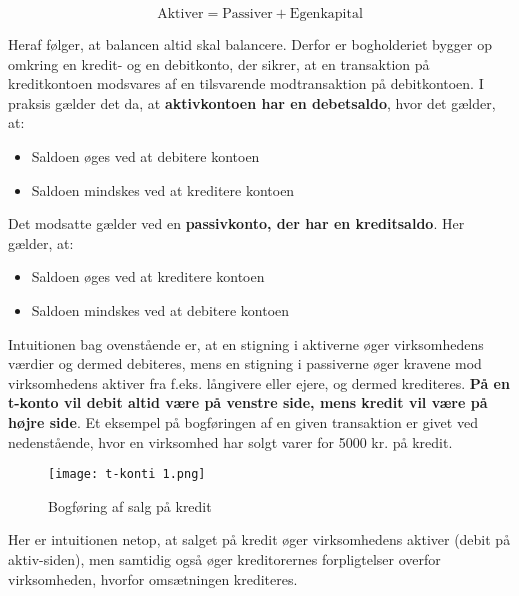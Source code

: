 \documentclass[10pt,reqno, usenames]{article}
\begin{document}
\begin{equation}
     \text {Aktiver} = \text {Passiver} + \text {Egenkapital} 
\end{equation}

Heraf følger, at balancen altid skal balancere. Derfor er bogholderiet bygger op omkring en kredit- og en debitkonto, der sikrer, at en transaktion på kreditkontoen modsvares af en tilsvarende modtransaktion på debitkontoen. I praksis gælder det da, at \textbf{aktivkontoen har en debetsaldo}, hvor det gælder, at:
\begin{itemize}
    \item Saldoen øges ved at debitere kontoen 
    \item Saldoen mindskes ved at kreditere kontoen
\end{itemize}
Det modsatte gælder ved en \textbf{passivkonto, der har en kreditsaldo}. Her gælder, at:  
\begin{itemize}
    \item Saldoen øges ved at kreditere kontoen 
    \item Saldoen mindskes ved at debitere kontoen
\end{itemize}
Intuitionen bag ovenstående er, at en stigning i aktiverne øger virksomhedens værdier og dermed debiteres, mens en stigning i passiverne øger kravene mod virksomhedens aktiver fra f.eks. långivere eller ejere, og dermed krediteres. \textbf{På en t-konto vil debit altid være på venstre side, mens kredit vil være på højre side}. Et eksempel på bogføringen af en given transaktion er givet ved nedenstående, hvor en virksomhed har solgt varer for 5000 kr. på kredit. 

\begin{figure}[h]
     \centering
     \texttt{[image: t-konti 1.png]}
     \caption{Bogføring af salg på kredit}
     \label{Figur 1}
\end{figure} 

Her er intuitionen netop, at salget på kredit øger virksomhedens aktiver (debit på aktiv-siden), men samtidig også øger kreditorernes forpligtelser overfor virksomheden, hvorfor omsætningen krediteres. 
\end{document}
